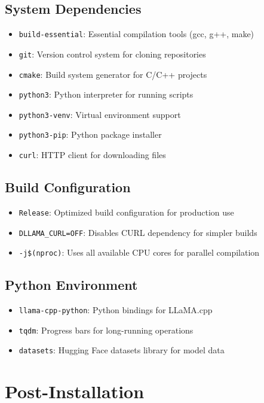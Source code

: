 \documentclass[11pt,a4paper]{article}
\begin{document}
\subsection{System Dependencies}
\begin{itemize}
    \item \texttt{build-essential}: Essential compilation tools (gcc, g++, make)
    \item \texttt{git}: Version control system for cloning repositories
    \item \texttt{cmake}: Build system generator for C/C++ projects
    \item \texttt{python3}: Python interpreter for running scripts
    \item \texttt{python3-venv}: Virtual environment support
    \item \texttt{python3-pip}: Python package installer
    \item \texttt{curl}: HTTP client for downloading files
\end{itemize}

\subsection{Build Configuration}
\begin{itemize}
    \item \texttt{Release}: Optimized build configuration for production use
    \item \texttt{DLLAMA\_CURL=OFF}: Disables CURL dependency for simpler builds
    \item \texttt{-j\$(nproc)}: Uses all available CPU cores for parallel compilation
\end{itemize}

\subsection{Python Environment}
\begin{itemize}
    \item \texttt{llama-cpp-python}: Python bindings for LLaMA.cpp
    \item \texttt{tqdm}: Progress bars for long-running operations
    \item \texttt{datasets}: Hugging Face datasets library for model data
\end{itemize}

\section{Post-Installation}
\end{document}
